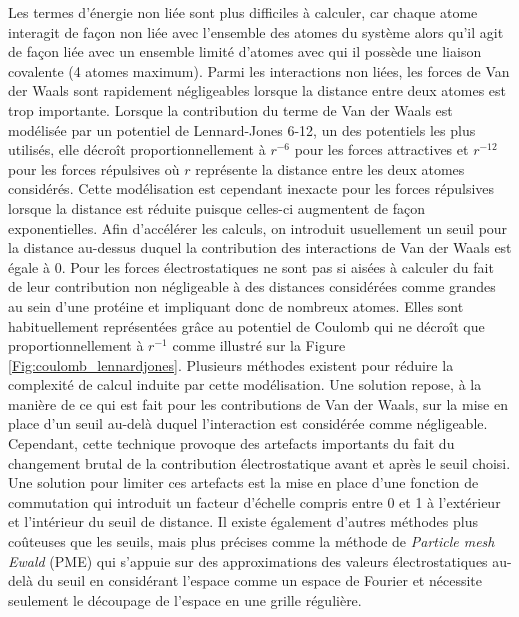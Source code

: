 Les termes d'énergie non liée sont plus difficiles à calculer, car chaque atome interagit de façon non liée avec l'ensemble des atomes du système alors qu'il agit de façon liée avec un ensemble limité d'atomes avec qui il possède une liaison covalente (4 atomes maximum). 
Parmi les interactions non liées, les forces de Van der Waals sont rapidement négligeables lorsque la distance entre deux atomes est trop importante. Lorsque la contribution du terme de Van der Waals est modélisée par un potentiel de Lennard-Jones 6-12, un des potentiels les plus utilisés, elle décroît proportionnellement à $r^{-6}$ pour les forces attractives et $r^{-12}$ pour les forces répulsives où $r$ représente la distance entre les deux atomes considérés. Cette modélisation est cependant inexacte pour les forces répulsives lorsque la distance est réduite puisque celles-ci augmentent de façon exponentielles. Afin d'accélérer les calculs, on introduit usuellement un seuil pour la distance au-dessus duquel la contribution des interactions de Van der Waals est égale à 0.
Pour les forces électrostatiques ne sont pas si aisées à calculer du fait de leur contribution non négligeable à des distances considérées comme grandes au sein d'une protéine et impliquant donc de nombreux atomes. Elles sont habituellement représentées grâce au potentiel de Coulomb qui ne décroît que proportionnellement à $r^{-1}$ comme illustré sur la Figure \ref{Fig:coulomb_lennardjones}. Plusieurs méthodes existent pour réduire la complexité de calcul induite par cette modélisation. Une solution repose, à la manière de ce qui est fait pour les contributions de Van der Waals, sur la mise en place d'un seuil au-delà duquel l'interaction est considérée comme négligeable. Cependant, cette technique provoque des artefacts importants du fait du changement brutal de la contribution électrostatique avant et après le seuil choisi. Une solution pour limiter ces artefacts est la mise en place d'une fonction de commutation qui introduit un facteur d'échelle compris entre 0 et 1 à l'extérieur et l'intérieur du seuil de distance. Il existe également d'autres méthodes plus coûteuses que les seuils, mais plus précises comme la méthode de \textit{Particle mesh Ewald} (PME) qui s'appuie sur des approximations des valeurs électrostatiques au-delà du seuil en considérant l'espace comme un espace de Fourier et nécessite seulement le découpage de l'espace en une grille régulière.

